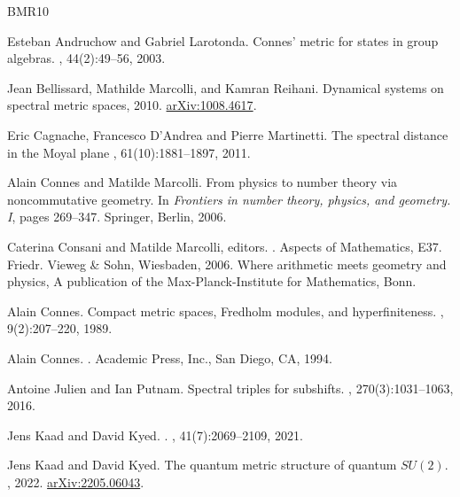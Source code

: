 \documentclass[12pt,a4paper,twoside,reqno]{amsart}
\theoremstyle{plain}
\theoremstyle{definition}
\theoremstyle{remark} %
\theoremstyle{plain}
\numberwithin{equation}{section}
\begin{document}
\begin{thebibliography}{BMR10}

Esteban Andruchow and Gabriel Larotonda.
\newblock Connes' metric for states in group algebras.
, 44(2):49--56, 2003.

Jean Bellissard, Mathilde Marcolli, and Kamran Reihani.
\newblock Dynamical systems on spectral metric spaces, 2010.
\newblock \href{https://arxiv.org/abs/1008.4617}{arXiv:1008.4617}.


Eric Cagnache,   Francesco  D'Andrea and  Pierre Martinetti.
\newblock The spectral distance in the {M}oyal plane
, 61(10):1881--1897, 2011.




Alain Connes and Matilde Marcolli.
\newblock From physics to number theory via noncommutative geometry.
\newblock In {\em Frontiers in number theory, physics, and geometry. {I}},
  pages 269--347. Springer, Berlin, 2006.

Caterina Consani and Matilde Marcolli, editors.
.
\newblock Aspects of Mathematics, E37. Friedr. Vieweg \& Sohn, Wiesbaden, 2006.
\newblock Where arithmetic meets geometry and physics, A publication of the
  Max-Planck-Institute for Mathematics, Bonn.

Alain Connes.
\newblock Compact metric spaces, {F}redholm modules, and hyperfiniteness.
, 9(2):207--220, 1989.

Alain Connes.
.
\newblock Academic Press, Inc., San Diego, CA, 1994.

Antoine Julien and Ian Putnam.
\newblock Spectral triples for subshifts.
, 270(3):1031--1063, 2016.

Jens {Kaad} and David {Kyed}.
.
, 41(7):2069--2109, 2021.

Jens Kaad and David Kyed.
\newblock The quantum metric structure of quantum {$SU(2)$}.
, 2022.
\newblock \href{https://arxiv.org/abs/2205.06043}{arXiv:2205.06043}.


\end{thebibliography}
\end{document}
